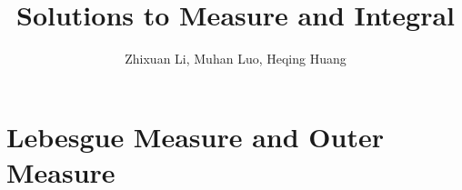 \documentclass[11pt]{article}
\theoremstyle{definition}
\begin{document}
  \title{Solutions to Measure and Integral}
  \author{Zhixuan Li, Muhan Luo, Heqing Huang}
  \maketitle


%  

  \section{Lebesgue Measure and Outer Measure}
  
\end{document}
